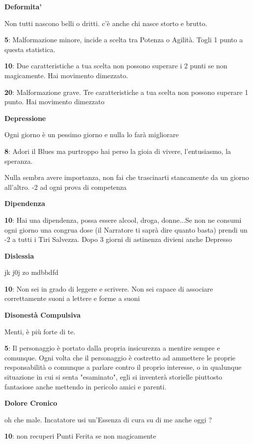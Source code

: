 \documentclass[a4paper,11pt,twoside,openany]{book}
\begin{document}
{\textbf{Deformita'}

Non tutti nascono belli o dritti. c'è anche chi nasce storto e brutto.

\textbf{5}: Malformazione minore, incide a scelta tra Potenza o Agilità. Togli 1 punto a questa statistica.

\textbf{10}: Due caratteristiche a tua scelta non possono superare i 2 punti se non magicamente. Hai movimento dimezzato.

\textbf{20}: Malformazione grave. Tre caratteristiche a tua scelta non possono superare 1 punto. Hai movimento dimezzato

\textbf{Depressione}

Ogni giorno è un pessimo giorno e nulla lo farà migliorare

\textbf{8}: Adori il Blues ma purtroppo hai perso la gioia di vivere, l'entusiasmo, la speranza.

Nulla sembra avere importanza, non fai che trascinarti stancamente da un giorno all'altro. -2 ad ogni prova di competenza

\textbf{Dipendenza}

\textbf{10}: Hai una dipendenza, possa essere alcool, droga, donne...Se non ne consumi ogni giorno una congrua dose (il Narratore ti saprà dire quanto basta) prendi un -2 a tutti i Tiri Salvezza. Dopo 3 giorni di astinenza divieni anche Depresso

\textbf{Dislessia}

jk j0j zo mdbbdfd

\textbf{10}: Non sei in grado di leggere e scrivere. Non sei capace di associare correttamente suoni a lettere e forme a suoni

\textbf{Disonestà Compulsiva}

Menti, è più forte di te.

\textbf{5}: Il personaggio è portato dalla propria insicurezza a mentire sempre e comunque. Ogni volta che il personaggio è costretto ad ammettere le proprie responsabilità o comunque a parlare contro il proprio interesse, o in qualunque situazione in cui si senta "esaminato", egli si inventerà storielle piuttosto fantasiose anche mettendo in pericolo amici e parenti.

\textbf{Dolore Cronico}

oh che male. Incatatore usi un'Essenza di cura su di me anche oggi ?

\textbf{10}: non recuperi Punti Ferita se non magicamente

}
\end{document}
